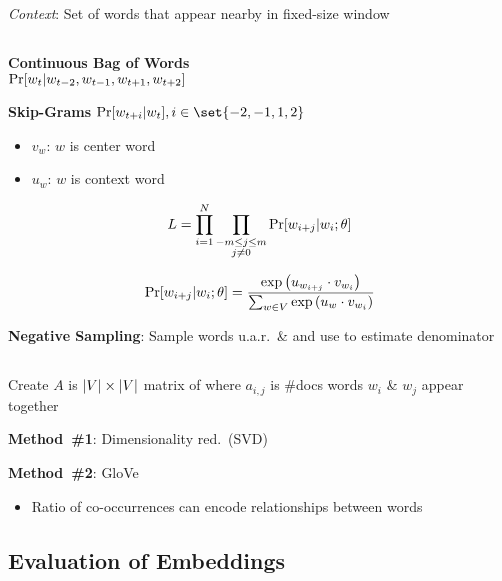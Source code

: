 \documentclass[9pt]{extarticle}
\renewcommand{\green}[1]{{\color{ForestGreen} #1}}
\newcommand{\greenbf}[1]{\textbf{\green{#1}}}
\begin{document}
\begin{multicols}{3}
  \textit{Context}: Set of words that appear nearby in fixed-size window

  \subsection*{}

  \greenbf{Continuous Bag of Words} \\ ${\Pr\lbrack w_t \vert w_{t-2}, w_{t-1}, w_{t+1}, w_{t+2}\rbrack}$

  \greenbf{Skip-Grams} ${\Pr\sbrack{w_{t+i} \vert w_{t}}, i \in \set{-2,-1,1,2}}$
  \begin{itemize}
    \item $v_w$: $w$ is center word
    \item $u_w$: $w$ is context word
  \end{itemize}

  \begin{equation*}
    L = \prod_{i=1}^{N} \prod_{\substack{-m \leq j \leq m \\ j \ne 0}} \Pr\lbrack w_{i+j} \vert w_{i} ; \theta\rbrack
  \end{equation*}

  \begin{equation*}
    \Pr\lbrack w_{i+j} \vert w_{i} ; \theta\rbrack = \frac{\exp\left(u_{w_{i+j}} \cdot v_{w_i} \right)}{\sum_{w \in V} \exp\left(u_{w} \cdot v_{w_i} \right)}
  \end{equation*}

  \greenbf{Negative Sampling}: Sample words u.a.r.\ \& and use to estimate denominator

  \subsection*{}

  Create $A$ is ${\lvert V\rvert \times \lvert V\rvert}$ matrix of where $a_{i,j}$ is \#docs words $w_i$ \& $w_j$ appear together

  \greenbf{Method~\#1}: Dimensionality red.\ (SVD)

  \greenbf{Method~\#2}: GloVe
  \begin{itemize}
    \item Ratio of co-occurrences can encode relationships between words
  \end{itemize}

  \subsection*{Evaluation of Embeddings}


\end{multicols}
\end{document}
